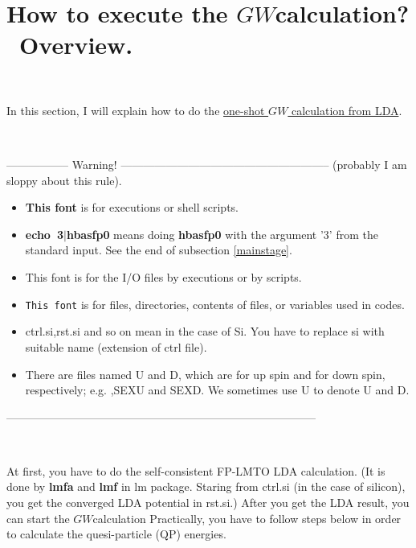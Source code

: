 \documentclass[a4paper,10pt,epsf,fleqn]{article}
\newcommand{\GW}{$GW$}
\newcommand{\exe}[1]{{\bf #1}}
\newcommand{\io}[1]{{\sf  #1}}
\begin{document}
\newpage
\section{How to execute the \GW calculation? \ Overview.}

\ 

In this section, I will explain how to do the \underline{one-shot $GW$ calculation from LDA}.

\ 

\noindent----------------- Warning! --------------------------------------------------------
(probably I am sloppy about this rule).
\vspace{-5mm}
\begin{itemize}
\item
{\bf This font} is for executions or shell scripts.

\item
{\bf echo~3$|$hbasfp0 } means doing {\bf hbasfp0 } with the argument '3' from the standard input.
See the end of subsection \ref{mainstage}.

\item
{\sf This font} is for the I/O files by executions or by scripts.

\item
{\tt This font} is for files, directories, contents of files, or variables used in codes.

\item
\io{ctrl.si},\io{rst.si} and so on mean in the case of Si. 
You have to replace si with suitable name (extension of ctrl file).

\item
 There are files named {U} and {D}, which are
 for up spin and for down spin, respectively; e.g. ,{\sf SEXU} and {\sf SEXD}.
 We sometimes use {U} to denote {U} and {D}.
\end{itemize}
\vspace{-5mm}
\noindent-----------------------------------------------------------------------------------

\ 

\noindent 

At first, you have to do the self-consistent FP-LMTO LDA calculation.
(It is done by \exe{lmfa} and \exe{lmf} in lm package.
Staring from \io{ctrl.si} (in the case of silicon),
you get the converged LDA potential in \io{rst.si}.) 
After you get the LDA result, you can start the \GW calculation
Practically, you have to follow steps below
in order to calculate the quesi-particle (QP) energies.
\end{document}
